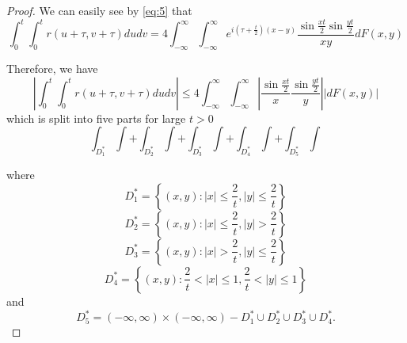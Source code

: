 \documentclass{article}
\begin{document}
\begin{proof}
We can easily see by \eqref{eq:5} that
\begin{equation}\label{eq:27}
\int_{0}^{t} \int_{0}^{t} r(u+\tau, v+\tau) dudv = 4 \int_{-\infty}^{\infty} \int_{-\infty}^{\infty} e^{i(\tau+\frac{t}{2})(x-y)} \frac{\sin \frac{xt}{2} \sin \frac{yt}{2}}{xy} dF(x,y)
\end{equation}

Therefore, we have
\begin{equation}\label{eq:28}
\left|\int_{0}^{t} \int_{0}^{t} r(u+\tau, v+\tau) dudv\right| \leq 4 \int_{-\infty}^{\infty} \int_{-\infty}^{\infty}\left|\frac{\sin \frac{xt}{2}}{x} \frac{\sin \frac{yt}{2}}{y}\right||dF(x,y)|
\end{equation}
which is split into five parts for large $t>0$
\begin{equation}\label{eq:29}
\int_{D_{1}^{*}} \int+\int_{D_{2}^{*}} \int+\int_{D_{3}^{*}} \int+\int_{D_{4}^{*}} \int+\int_{D_{5}^{*}} \int
\end{equation}

where
\begin{equation}\label{eq:30}
D_{1}^{*}=\left\{(x,y):|x| \leq \frac{2}{t}, |y| \leq \frac{2}{t}\right\}
\end{equation}
\begin{equation}\label{eq:31}
D_{2}^{*}=\left\{(x,y):|x| \leq \frac{2}{t}, |y| > \frac{2}{t}\right\}
\end{equation}
\begin{equation}\label{eq:32}
D_{3}^{*}=\left\{(x,y):|x| > \frac{2}{t}, |y| \leq \frac{2}{t}\right\}
\end{equation}
\begin{equation}\label{eq:33}
D_{4}^{*}=\left\{(x,y): \frac{2}{t} < |x| \leq 1, \frac{2}{t} < |y| \leq 1\right\}
\end{equation}
and
\begin{equation}\label{eq:34}
D_{5}^{*}=(-\infty, \infty) \times (-\infty, \infty) - D_{1}^{*} \cup D_{2}^{*} \cup D_{3}^{*} \cup D_{4}^{*}.
\end{equation}


\end{proof}
\end{document}
